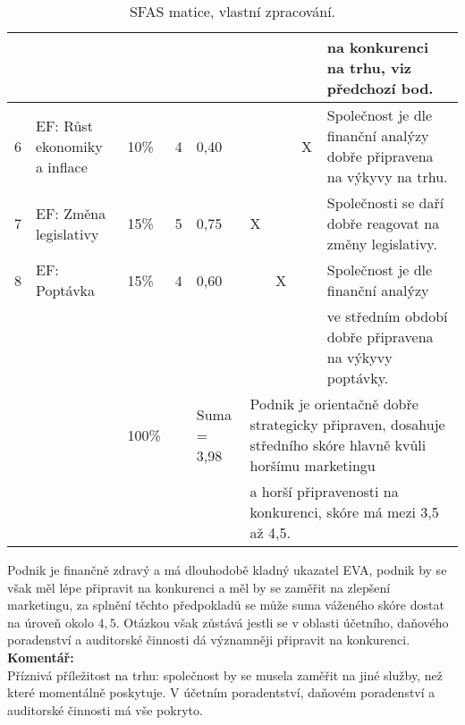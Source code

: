 \begin{table}[!hbtp]
{{\begin{tabular}{|l|l|l|l|l|llll|}
 &  &  &  &  & \multicolumn{1}{l|}{} & \multicolumn{1}{l|}{} & \multicolumn{1}{l|}{} & na konkurenci na trhu, viz předchozí bod. \\ \hline
6 & EF: Růst ekonomiky a inflace & 10\% & 4 & 0,40 & \multicolumn{1}{l|}{} & \multicolumn{1}{l|}{} & \multicolumn{1}{l|}{X} & Společnost je dle finanční analýzy dobře připravena na výkyvy na trhu. \\ \hline
7 & EF: Změna legislativy & 15\% & 5 & 0,75 & \multicolumn{1}{l|}{X} & \multicolumn{1}{l|}{} & \multicolumn{1}{l|}{} & Společnosti se daří dobře reagovat na změny legislativy. \\ \hline
8 & EF: Poptávka & 15\% & 4 & 0,60 & \multicolumn{1}{l|}{} & \multicolumn{1}{l|}{X} & \multicolumn{1}{l|}{} & Společnost je dle finanční analýzy \\
 &  &  &  &  & \multicolumn{1}{l|}{} & \multicolumn{1}{l|}{} & \multicolumn{1}{l|}{} & ve středním období dobře připravena na výkyvy poptávky. \\ \hline
\cellcolor[HTML]{C0C0C0} & \cellcolor[HTML]{C0C0C0} & 100\% & \cellcolor[HTML]{C0C0C0} & Suma = 3,98 & \multicolumn{4}{l|}{Podnik je orientačně dobře strategicky připraven, dosahuje středního skóre hlavně kvůli horšímu marketingu} \\
\cellcolor[HTML]{C0C0C0} & \cellcolor[HTML]{C0C0C0} &  & \cellcolor[HTML]{C0C0C0} &  & \multicolumn{4}{l|}{a horší připravenosti na konkurenci, skóre má mezi 3,5 až 4,5.} \\ \hline
\end{tabular}
}
}
\caption[SFAS matice]{SFAS matice, vlastní zpracování.}
\label{tab:SFAS matice}
\end{table}

Podnik je finančně zdravý a má dlouhodobě kladný ukazatel EVA, podnik by se však měl lépe připravit na konkurenci a měl by se zaměřit na zlepšení marketingu, za splnění těchto předpokladů se může suma váženého skóre dostat na úroveň okolo $4,5$. Otázkou však zůstává jestli se v oblasti účetního, daňového poradenství a auditorské činnosti dá významněji připravit na konkurenci.\\

\noindent\textbf{Komentář:}\\

Příznivá příležitost na trhu: společnost by se musela zaměřit na jiné služby, než které momentálně poskytuje. V účetním poradentství, daňovém poradenství a auditorské činnosti má vše pokryto.\\

